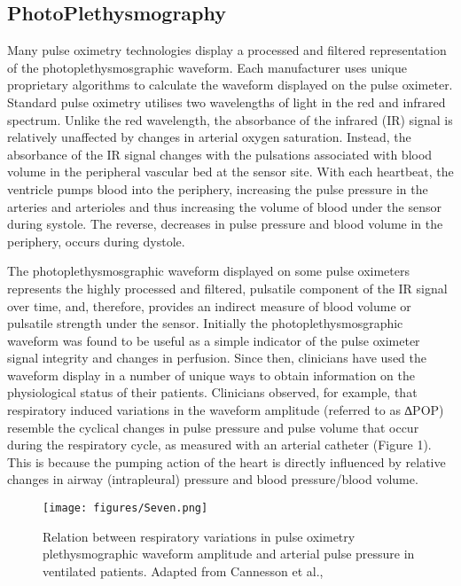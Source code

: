 \documentclass[twocolumn]{cinc}
\begin{document}
\subsection{PhotoPlethysmography}
Many pulse oximetry technologies display a processed and filtered representation of the photoplethysmosgraphic waveform. Each manufacturer uses unique proprietary algorithms to calculate the waveform displayed on the pulse oximeter. Standard pulse oximetry utilises two wavelengths of light in the red and infrared spectrum. Unlike the red wavelength, the absorbance of the infrared (IR) signal is relatively unaffected by changes in arterial oxygen saturation. Instead, the absorbance of the IR signal changes with the pulsations associated with blood volume in the peripheral vascular bed at the sensor site. With each heartbeat, the ventricle pumps blood into the periphery, increasing the pulse pressure in the arteries and arterioles and thus increasing the volume of blood under the sensor during systole. The reverse, decreases in pulse pressure and blood volume in the periphery, occurs
during dystole.

The photoplethysmosgraphic waveform displayed on some pulse oximeters represents the highly processed and filtered, pulsatile component of the IR signal over time, and, therefore, provides an indirect measure of blood volume or pulsatile strength under the sensor. Initially the photoplethysmosgraphic waveform was found to be useful as a simple indicator of the pulse oximeter signal integrity and changes in perfusion. Since then, clinicians have used the waveform display in a number of unique ways to obtain information on the physiological status of their patients. Clinicians observed, for example, that respiratory induced variations in the waveform amplitude (referred to as ∆POP) resemble the cyclical changes in pulse pressure and pulse volume that occur during the respiratory cycle, as measured with an arterial catheter (Figure 1). This is because the pumping action of the heart is directly influenced by relative changes in airway (intrapleural) pressure and blood pressure/blood volume.\cite{barach2000pulsus} 
\begin{figure}[h!]
\centering
\texttt{[image: figures/Seven.png]}
\caption{Relation between respiratory variations in pulse oximetry plethysmographic waveform amplitude and arterial pulse pressure in ventilated patients. Adapted from Cannesson et al.,}
\label{fig:RIIVandPPG}
\end{figure}
\end{document}
